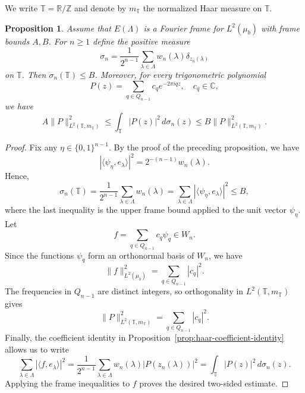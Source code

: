 \documentclass[reqno,a4paper,12pt]{amsart}
\newtheorem{proposition}[definition]{Proposition}
\def\Z{{\mathbb Z}}
\def\R{{\mathbb R}}
\def\T{{\mathbb T}}
\def\C{{\mathbb C}}
\begin{document}
We write $\T=\R/\Z$ and denote by $m_\T$ the normalized Haar measure on $\T$.

\begin{proposition}\label{prop:sampling}
Assume that $E(\Lambda)$ is a Fourier frame for
$L^2(\mu_b)$ with frame bounds $A,B$. For $n\ge1$ define the positive measure
$$
        \sigma_n
        =
        \frac1{2^{n-1}}
        \sum_{\lambda\in\Lambda}
        w_n(\lambda)\delta_{z_n(\lambda)}
$$
on $\T$. Then $\sigma_n(\T)\le B$. Moreover, for every trigonometric
polynomial
$$
        P(z)=\sum_{q\in Q_{n-1}}c_qe^{-2\pi iqz}, \quad c_q \in \C,
$$
we have
\begin{equation}\label{eq:sampling-frame}
        A\|P\|_{L^2(\T,m_\T)}^2
        \le
        \int_{\T}|P(z)|^2\,d\sigma_n(z)
        \le
       B\|P\|_{L^2(\T,m_\T)}^2.
\end{equation}
\end{proposition}

\begin{proof}
Fix any $\eta\in\{0,1\}^{n-1}$. By the proof of the preceding
proposition, we have
$$
        |\langle\psi_\eta,e_\lambda\rangle|^2
        =
        2^{-(n-1)}w_n(\lambda).
$$
Hence,
$$
        \sigma_n(\T)
        =
        \frac1{2^{n-1}}\sum_{\lambda\in\Lambda}w_n(\lambda)
        =
        \sum_{\lambda\in\Lambda}|\langle\psi_\eta,e_\lambda\rangle|^2
        \le B,
$$
where the last inequality is the upper frame bound applied to the unit
vector $\psi_\eta$.
Let
$$
        f=\sum_{q\in Q_{n-1}}c_q\psi_q\in W_n.
$$
Since the functions $\psi_q$ form an orthonormal basis of $W_n$, we have
$$
        \|f\|_{L^2(\mu_b)}^2=\sum_{q\in Q_{n-1}}|c_q|^2.
$$
The frequencies in $Q_{n-1}$ are distinct integers, so orthogonality in
$L^2(\T,m_\T)$ gives
$$
        \|P\|_{L^2(\T,m_\T)}^2=\sum_{q\in Q_{n-1}}|c_q|^2.
$$
Finally, the coefficient identity in Proposition~\ref{prop:haar-coefficient-identity} allows us to write
$$
        \sum_{\lambda\in\Lambda}|\langle f,e_\lambda\rangle|^2
        =
        \frac1{2^{n-1}}\sum_{\lambda\in\Lambda}
        w_n(\lambda)|P(z_n(\lambda))|^2
        =
        \int_{\T}|P(z)|^2\,d\sigma_n(z).
$$
Applying the frame inequalities to $f$ proves the desired two-sided
estimate.
\end{proof}
\end{document}
